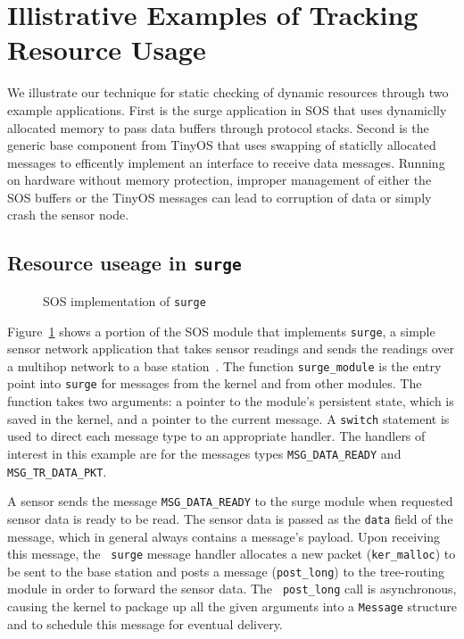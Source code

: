 \section{Illistrative Examples of Tracking Resource Usage}
\label{sec:example}

We illustrate our technique for static checking of dynamic resources
through two example applications.  First is the surge application in
SOS that uses dynamiclly allocated memory to pass data buffers through
protocol stacks.  Second is the generic base component from TinyOS
that uses swapping of staticlly allocated messages to efficently
implement an interface to receive data messages.  Running on hardware
without memory protection, improper management of either the SOS
buffers or the TinyOS messages can lead to corruption of data or
simply crash the sensor node.

%
%


\subsection{Resource useage in {\tt surge}}

\begin{figure}[t]

\caption{SOS implementation of {\tt surge}\label{fig:surge}}
\end{figure}

Figure~\ref{fig:surge} shows a portion of the SOS module that
implements {\tt surge}, a simple sensor network application that takes
sensor readings and sends the readings over a multihop network to a
base station~\cite{nesC}.  The function {\tt surge\_module} is the
entry point into {\tt surge} for messages from the kernel and from
other modules.  The function takes two arguments: a pointer to the
module's persistent state, which is saved in the kernel, and a pointer
to the current message.  A {\tt switch} statement is used to direct
each message type to an appropriate handler.  The handlers of interest
in this example are for the messages types {\tt MSG\_DATA\_READY} and
{\tt MSG\_TR\_DATA\_PKT}.

A sensor sends the message {\tt MSG\_DATA\_READY} to the surge module
when requested sensor data is ready to be read. The sensor data is
passed as the {\tt data} field of the message, which in general always
contains a message's payload.  Upon receiving this message, the {\tt
surge} message handler allocates a new packet ({\tt ker\_malloc}) to
be sent to the base station and posts a message ({\tt post\_long}) to
the tree-routing module in order to forward the sensor data.  The {\tt
post\_long} call is asynchronous, causing the kernel to package up all
the given arguments into a {\tt Message} structure and to schedule
this message for eventual delivery.

